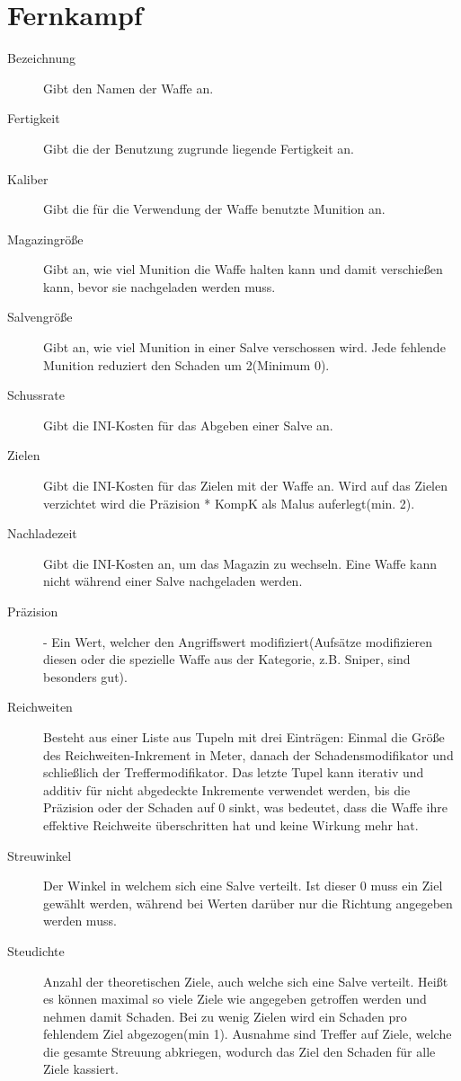 \documentclass[a4paper,12pt,oneside]{book}
\begin{document}
\section{Fernkampf}
\begin{description}
\item[Bezeichnung] Gibt den Namen der Waffe an.
\item[Fertigkeit]Gibt die der Benutzung zugrunde liegende Fertigkeit an.
\item[Kaliber] Gibt die für die Verwendung der Waffe benutzte Munition an.
\item[Magazingröße] Gibt an, wie viel Munition die Waffe halten kann und damit verschießen kann, bevor sie nachgeladen werden muss.
\item[Salvengröße] Gibt an, wie viel Munition in einer Salve verschossen wird. Jede fehlende Munition reduziert den Schaden um 2(Minimum 0).
\item[Schussrate] Gibt die INI-Kosten für das Abgeben einer Salve an.
\item[Zielen] Gibt die INI-Kosten für das Zielen mit der Waffe an. Wird auf das Zielen verzichtet wird die Präzision * KompK als Malus auferlegt(min. 2).
\item[Nachladezeit] Gibt die INI-Kosten an, um das Magazin zu wechseln. Eine Waffe kann nicht während einer Salve nachgeladen werden.
\item[Präzision] - Ein Wert, welcher den Angriffswert modifiziert(Aufsätze modifizieren diesen oder die spezielle Waffe aus der Kategorie, z.B. Sniper, sind besonders gut).
\item[Reichweiten] Besteht aus einer Liste aus Tupeln mit drei Einträgen: Einmal die Größe des Reichweiten-Inkrement in Meter, danach der Schadensmodifikator und schließlich der Treffermodifikator. Das letzte Tupel kann iterativ und additiv für nicht abgedeckte Inkremente verwendet werden, bis die Präzision oder der Schaden auf 0 sinkt, was bedeutet, dass die Waffe ihre effektive Reichweite überschritten hat und keine Wirkung mehr hat. 
\item[Streuwinkel] Der Winkel in welchem sich eine Salve verteilt. Ist dieser 0 muss ein Ziel gewählt werden, während bei Werten darüber nur die Richtung angegeben werden muss.
\item[Steudichte] Anzahl der theoretischen Ziele, auch welche sich eine Salve verteilt. Heißt es können maximal so viele Ziele wie angegeben getroffen werden und nehmen damit Schaden. Bei zu wenig Zielen wird ein Schaden pro fehlendem Ziel abgezogen(min 1). Ausnahme sind Treffer auf Ziele, welche die gesamte Streuung abkriegen, wodurch das Ziel den Schaden für alle Ziele kassiert.
\end{description}
\end{document}
